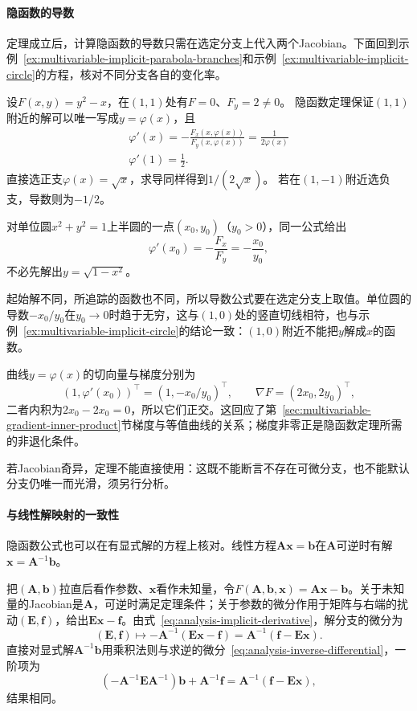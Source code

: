 \paragraph{隐函数的导数}

定理成立后，计算隐函数的导数只需在选定分支上代入两个Jacobian。下面回到示例~\ref{ex:multivariable-implicit-parabola-branches}和示例~\ref{ex:multivariable-implicit-circle}的方程，核对不同分支各自的变化率。

\begin{example}[隐函数分支的导数]
\label{ex:multivariable-implicit-branch-derivative}
设$F(x,y)=y^2-x$，在$(1,1)$处有$F=0$、$F_y=2\neq0$。
隐函数定理保证$(1,1)$附近的解可以唯一写成$y=\varphi(x)$，且
\[
 \begin{gathered}
\varphi'(x)=-\frac{F_x(x,\varphi(x))}{F_y(x,\varphi(x))}
 =\frac1{2\varphi(x)}\\
\varphi'(1)=\frac12.
 \end{gathered}
\]
直接选正支$\varphi(x)=\sqrt x$，求导同样得到$1/(2\sqrt x)$。
若在$(1,-1)$附近选负支，导数则为$-1/2$。

对单位圆$x^2+y^2=1$上半圆的一点$(x_0,y_0)$（$y_0>0$），同一公式给出
\[
 \varphi'(x_0)=-\frac{F_x}{F_y}=-\frac{x_0}{y_0},
\]
不必先解出$y=\sqrt{1-x^2}$。
\end{example}

起始解不同，所追踪的函数也不同，所以导数公式要在选定分支上取值。单位圆的导数$-x_0/y_0$在$y_0\to0$时趋于无穷，这与$(1,0)$处的竖直切线相符，也与示例~\ref{ex:multivariable-implicit-circle}的结论一致：$(1,0)$附近不能把$y$解成$x$的函数。

曲线$y=\varphi(x)$的切向量与梯度分别为
\[
 (1,\varphi'(x_0))^\top=(1,-x_0/y_0)^\top,\qquad\nabla F=(2x_0,2y_0)^\top,
\]
二者内积为$2x_0-2x_0=0$，所以它们正交。这回应了第~\ref{sec:multivariable-gradient-inner-product}节梯度与等值曲线的关系；梯度非零正是隐函数定理所需的非退化条件。

若Jacobian奇异，定理不能直接使用：这既不能断言不存在可微分支，也不能默认分支仍唯一而光滑，须另行分析。

\paragraph{与线性解映射的一致性}
隐函数公式也可以在有显式解的方程上核对。线性方程$\bm A\bm x=\bm b$在$\bm A$可逆时有解$\bm x=\bm A^{-1}\bm b$。

把$(\bm A,\bm b)$拉直后看作参数、$\bm x$看作未知量，令$F(\bm A,\bm b,\bm x)=\bm A\bm x-\bm b$。关于未知量的Jacobian是$\bm A$，可逆时满足定理条件；关于参数的微分作用于矩阵与右端的扰动$(\bm E,\bm f)$，给出$\bm E\bm x-\bm f$。由式~\eqref{eq:analysis-implicit-derivative}，解分支的微分为
\[
 (\bm E,\bm f)\mapsto-\bm A^{-1}(\bm E\bm x-\bm f)=\bm A^{-1}(\bm f-\bm E\bm x).
\]
直接对显式解$\bm A^{-1}\bm b$用乘积法则与求逆的微分~\eqref{eq:analysis-inverse-differential}，一阶项为
\[
 (-\bm A^{-1}\bm E\bm A^{-1})\bm b+\bm A^{-1}\bm f=\bm A^{-1}(\bm f-\bm E\bm x),
\]
结果相同。

